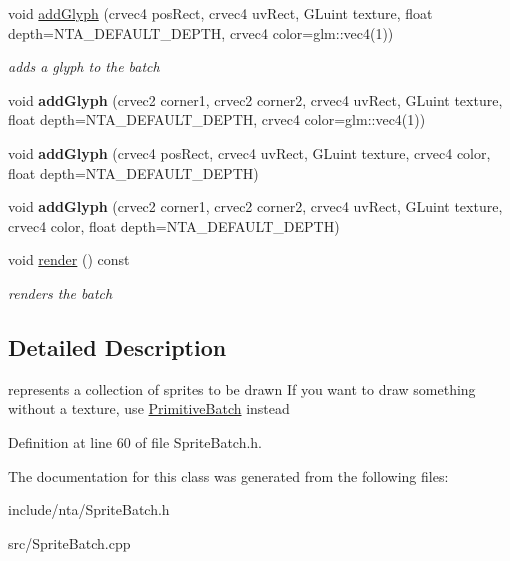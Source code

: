 \begin{DoxyCompactItemize}
\mbox{\label{classnta_1_1SpriteBatch_aa703fb92d0bd42865c21fdfb2625660d}} 
void \hyperlink{classnta_1_1SpriteBatch_aa703fb92d0bd42865c21fdfb2625660d}{add\+Glyph} (crvec4 pos\+Rect, crvec4 uv\+Rect, G\+Luint texture, float depth=N\+T\+A\+\_\+\+D\+E\+F\+A\+U\+L\+T\+\_\+\+D\+E\+P\+TH, crvec4 color=glm\+::vec4(1))
\begin{DoxyCompactList}\small\item\em adds a glyph to the batch \end{DoxyCompactList}\item 
\mbox{\label{classnta_1_1SpriteBatch_a4a6041951ba065a9ad0e7265bef531ef}} 
void {\bfseries add\+Glyph} (crvec2 corner1, crvec2 corner2, crvec4 uv\+Rect, G\+Luint texture, float depth=N\+T\+A\+\_\+\+D\+E\+F\+A\+U\+L\+T\+\_\+\+D\+E\+P\+TH, crvec4 color=glm\+::vec4(1))
\item 
\mbox{\label{classnta_1_1SpriteBatch_a5bfd87da8549218f739977bb3fa3361c}} 
void {\bfseries add\+Glyph} (crvec4 pos\+Rect, crvec4 uv\+Rect, G\+Luint texture, crvec4 color, float depth=N\+T\+A\+\_\+\+D\+E\+F\+A\+U\+L\+T\+\_\+\+D\+E\+P\+TH)
\item 
\mbox{\label{classnta_1_1SpriteBatch_a1acc97aec74cdd4709ea0e2bc064a3ce}} 
void {\bfseries add\+Glyph} (crvec2 corner1, crvec2 corner2, crvec4 uv\+Rect, G\+Luint texture, crvec4 color, float depth=N\+T\+A\+\_\+\+D\+E\+F\+A\+U\+L\+T\+\_\+\+D\+E\+P\+TH)
\item 
\mbox{\label{classnta_1_1SpriteBatch_ae7566d38b0cdd33f2b3e16dfcf993714}} 
void \hyperlink{classnta_1_1SpriteBatch_ae7566d38b0cdd33f2b3e16dfcf993714}{render} () const
\begin{DoxyCompactList}\small\item\em renders the batch \end{DoxyCompactList}\end{DoxyCompactItemize}


\subsection{Detailed Description}
represents a collection of sprites to be drawn If you want to draw something without a texture, use \hyperlink{classnta_1_1PrimitiveBatch}{Primitive\+Batch} instead 

Definition at line 60 of file Sprite\+Batch.\+h.



The documentation for this class was generated from the following files\+:\begin{DoxyCompactItemize}
\item 
include/nta/Sprite\+Batch.\+h\item 
src/Sprite\+Batch.\+cpp\end{DoxyCompactItemize}
